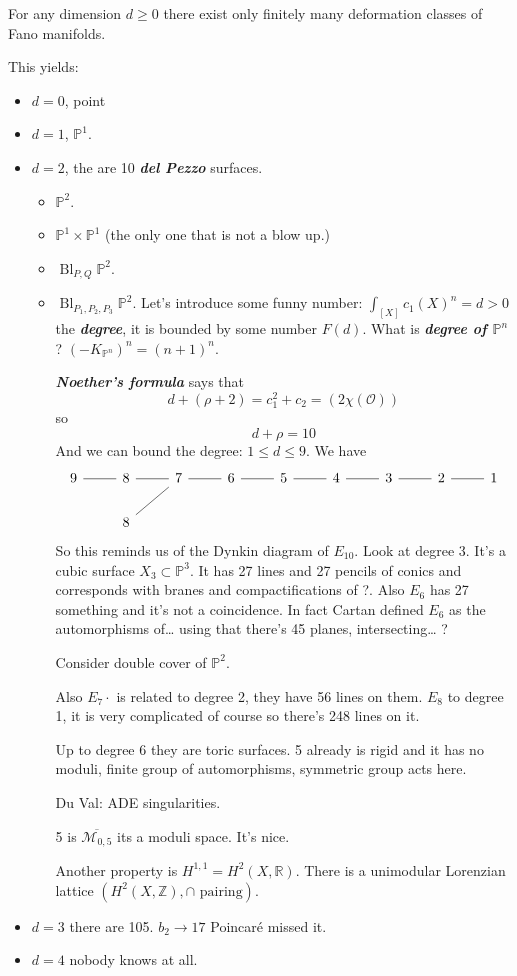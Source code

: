 \documentclass{article}
\numberwithin{equation}{section}
\newcommand{\R}{\mathbb{R}}
\newcommand{\Z}{\mathbb{Z}}
\renewcommand{\P}{\mathbb{P}}
\newcommand{\Mc}{\mathcal{M}}
\newcommand{\Oc}{\mathcal{O}}
\DeclareMathOperator{\Bl}{Bl}
\begin{document}
	\begin{thm}
		For any dimension $d\geq0$ there exist only finitely many deformation classes of Fano manifolds.
	\end{thm}
	This yields:
	\begin{itemize}
		\item $d=0$, point
		\item $d=1$, $\P^1$.
		\item $d=2$, the are 10 \textbf{\textit{del Pezzo}} surfaces.
		\begin{itemize}
			\item $\P^2$.
			\item $\P^1\times \P^1$ (the only one that is not a blow up.)
			\item $\Bl_{P,Q}\P^2$.
			\item $\Bl_{P_1,P_2,P_3}\P^2$.
			Let's introduce some funny number: $\int_{[X]}c_1(X)^n=d>0$ the \textbf{\textit{degree}}, it is bounded by some number $F(d)$. What is \textbf{\textit{degree of $\P^n$}}? $(-K_{\P^n})^n=(n+1)^n$.
			
			\textbf{\textit{Noether's formula}} says that 
			\[d+(\rho+2)=c_1^2+c_2=(2\chi(\Oc))\]
			so
			\[d+\rho=10\]
			And we can bound the degree: $1\leq d\leq 9$. We have
			\[\begin{tikzcd}
				9\arrow[r,no head]&8\arrow[r,no head]&7\arrow[ld,no head]\arrow[r,no head]&6\arrow[r,no head]&5\arrow[r,no head]&4\arrow[r,no head]&3\arrow[r,no head]&2\arrow[r,no head]&1\\
				&8
			\end{tikzcd}\]
			So this reminds us of the Dynkin diagram of $E_{10}$. Look at degree 3. It's a cubic surface $X_3\subset\P^3$. It has 27 lines and 27 pencils of conics and corresponds with branes and compactifications of ?. Also $E_6$ has 27 something and it's not a coincidence. In fact Cartan defined $E_6$ as the automorphisms of… using that there's 45 planes, intersecting… ?
			
			Consider double cover of $\P^2$.
			
			Also $E_7·$ is related to degree 2, they have 56 lines on them. $E_8$ to degree 1, it is very complicated of course so there's 248 lines on it.
			
			Up to degree 6 they are toric surfaces. 5 already is rigid and it has no moduli, finite group of automorphisms, symmetric group acts here.
			
			Du Val: ADE singularities.
			
			5 is $\overline{\Mc_{0,5}}$ its a moduli space. It's nice.
			
			Another property is $H^{1,1}=H^2(X,\R)$. There is a unimodular Lorenzian lattice $(H^2(X,\Z),\cap\text{ pairing})$.
		\end{itemize}
		\item $d=3$ there are 105. $b_2\to 17$ Poincaré missed it.
		\item $d=4$ nobody knows at all.
	\end{itemize}
	
\end{document}
